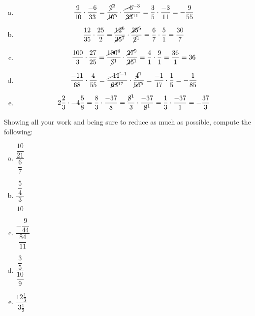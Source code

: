 \documentclass[11pt,letterpaper]{article}
\begin{document}
\sol
\begin{enumerate}[(a)]
\item 
	\[
	\dfrac{9}{10} \cdot \dfrac{-6}{33}= \dfrac{\cancel{9}^3}{\cancel{10}^5} \cdot \dfrac{\cancel{-6}^{-3}}{\cancel{33}^{11}}= \dfrac{3}{5} \cdot \dfrac{-3}{11}= -\dfrac{9}{55}
	\] \pspace

\item 
	\[
	\dfrac{12}{35} \cdot \dfrac{25}{2}= \dfrac{\cancel{12}^6}{\cancel{35}^7} \cdot \dfrac{\cancel{25}^5}{\cancel{2}^1}= \dfrac{6}{7} \cdot \dfrac{5}{1}= \dfrac{30}{7}
	\] \pspace

\item 
	\[
	\dfrac{100}{3} \cdot \dfrac{27}{25}= \dfrac{\cancel{100}^4}{\cancel{3}^1} \cdot \dfrac{\cancel{27}^9}{\cancel{25}^1}= \dfrac{4}{1} \cdot \dfrac{9}{1}= \dfrac{36}{1}= 36
	\] \pspace

\item 
	\[
	\dfrac{-11}{68} \cdot \dfrac{4}{55}= \dfrac{\cancel{-11}^{-1}}{\cancel{68}^{17}} \cdot \dfrac{\cancel{4}^1}{\cancel{55}^5}= \dfrac{-1}{17} \cdot \dfrac{1}{5}= -\dfrac{1}{85}
	\] \pspace

\item 
	\[
	2 \frac{2}{3} \cdot -4 \frac{5}{8}= \dfrac{8}{3} \cdot \dfrac{-37}{8}= \dfrac{\cancel{8}^1}{3} \cdot \dfrac{-37}{\cancel{8}^1}= \dfrac{1}{3} \cdot \dfrac{-37}{1}= -\dfrac{37}{3}
	\]
\end{enumerate}



\newpage



 Showing all your work and being sure to reduce as much as possible, compute the following:
\begin{enumerate}[(a)]
\item $\dfrac{\dfrac{10}{21}}{\dfrac{6}{7}}$
\item $\dfrac{\dfrac{5}{4}}{\dfrac{3}{10}}$
\item $\dfrac{-\dfrac{9}{44}}{\dfrac{84}{11}}$
\item $\dfrac{\dfrac{3}{5}}{\dfrac{10}{9}}$
\item $\dfrac{12\frac{1}{3}}{3\frac{1}{2}}$
\end{enumerate} \pspace
\end{document}
